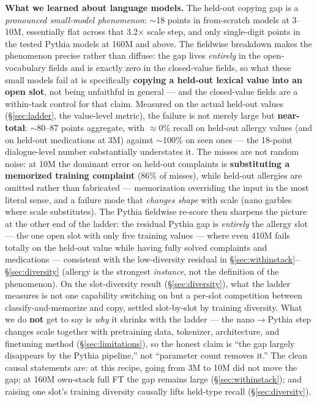 \documentclass[11pt]{article}
\begin{document}
\textbf{What we learned about language models.} The held-out copying gap is a \emph{pronounced small-model phenomenon}: $\sim$18 points in from-scratch models at 3--10M, essentially flat across that 3.2$\times$ scale step, and only single-digit points in the tested Pythia models at 160M and above. The fieldwise breakdown makes the phenomenon precise rather than diffuse: the gap lives \emph{entirely} in the open-vocabulary fields and is exactly zero in the closed-value fields, so what these small models fail at is specifically \textbf{copying a held-out lexical value into an open slot}, not being unfaithful in general --- and the closed-value fields are a within-task control for that claim. Measured on the actual held-out values (\S\ref{sec:ladder}, the value-level metric), the failure is not merely large but \textbf{near-total}: $\sim$80--87 points aggregate, with $\approx$0\% recall on held-out allergy values (and on held-out medications at 3M) against $\sim$100\% on seen ones --- the 18-point dialogue-level number substantially understates it. The misses are not random noise: at 10M the dominant error on held-out complaints is \textbf{substituting a memorized training complaint} (86\% of misses), while held-out allergies are omitted rather than fabricated --- memorization overriding the input in the most literal sense, and a failure mode that \emph{changes shape} with scale (nano garbles where scale substitutes). The Pythia fieldwise re-score then sharpens the picture at the other end of the ladder: the residual Pythia gap is \emph{entirely} the allergy slot --- the one open slot with only five training values --- where even 410M fails totally on the held-out value while having fully solved complaints and medications --- consistent with the low-diversity residual in \S\ref{sec:withinstack}--\S\ref{sec:diversity} (allergy is the strongest \emph{instance}, not the definition of the phenomenon). On the slot-diversity result (\S\ref{sec:diversity}), what the ladder measures is not one capability switching on but a per-slot competition between classify-and-memorize and copy, settled slot-by-slot by training diversity. What we do \textbf{not} get to say is \emph{why} it shrinks with the ladder --- the nano$\rightarrow$Pythia step changes scale together with pretraining data, tokenizer, architecture, and finetuning method (\S\ref{sec:limitations}), so the honest claim is ``the gap largely disappears by the Pythia pipeline,'' not ``parameter count removes it.'' The clean causal statements are: at this recipe, going from 3M to 10M did not move the gap; at 160M own-stack full FT the gap remains large (\S\ref{sec:withinstack}); and raising one slot's training diversity causally lifts held-type recall (\S\ref{sec:diversity}).
\end{document}
